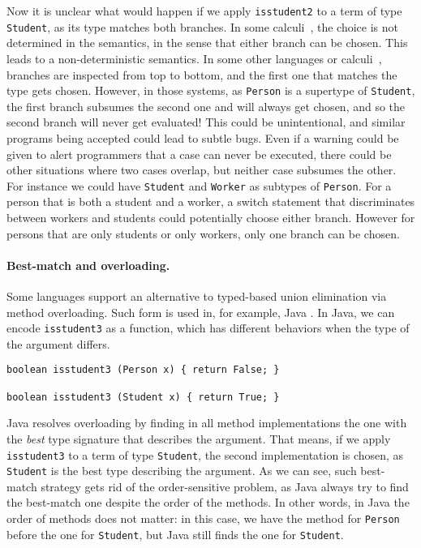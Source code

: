 \noindent Now it is unclear what would happen if we apply \lstinline{isstudent2}
to a term of type \lstinline{Student}, as its type matches both branches. In
some calculi~\citep{dunfield2014elaborating}, the choice is not determined in
the semantics, in the sense that either branch can be chosen. This leads to a
non-deterministic semantics. In some other languages or
calculi~\citep{castagna:settheoretic}, branches are inspected from top to
bottom, and the first one that matches the type gets chosen. However, in those
systems, as \lstinline{Person} is a supertype of \lstinline{Student}, the first
branch subsumes the second one and will always get chosen, and so the second
branch will never get evaluated! This could be unintentional, and similar
programs being accepted could lead to subtle bugs. Even if a warning could be
given to alert programmers that a case can never be executed, there could be
other situations where two cases overlap, but neither case subsumes the other.
For instance we could have \lstinline{Student} and \lstinline{Worker} as
subtypes of \lstinline{Person}. For a person that is both a student and a
worker, a switch statement that discriminates between workers and students could
potentially choose either branch. However for persons that are only students or
only workers, only one branch can be chosen.

\paragraph{Best-match and overloading.}
Some languages support an alternative to typed-based union elimination via method
overloading. Such form is used in, for example, Java \cite{javadoc}. In Java, we
can encode \lstinline{isstudent3} as a function, which has different
behaviors when the type of the argument differs.

\begin{lstlisting}
boolean isstudent3 (Person x) { return False; }

boolean isstudent3 (Student x) { return True; }
\end{lstlisting}

Java resolves overloading by finding in all method implementations the one with
the \textit{best} type signature that describes the argument. That means, if we
apply \lstinline{isstudent3} to a term of type \lstinline{Student}, the second
implementation is chosen, as \lstinline{Student} is the best type describing the
argument. As we can see, such best-match strategy gets rid of the
order-sensitive problem, as Java always try to find the best-match one despite
the order of the methods. In other words, in Java the order of methods does not matter:
in this case,
we have the method for \lstinline{Person} before the one for \lstinline{Student}, but Java still finds
the one for \lstinline{Student}.

